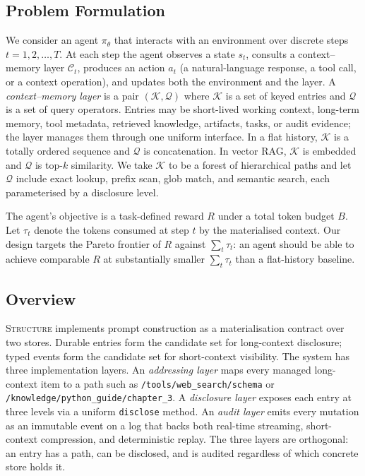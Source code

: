 
\subsection{Problem Formulation}
\label{sec:problem}

We consider an agent $\pi_\theta$ that interacts with an environment
over discrete steps $t = 1, 2, \dots, T$. At each step the agent
observes a state $s_t$, consults a context--memory layer
$\mathcal{C}_t$, produces an action $a_t$ (a natural-language response,
a tool call, or a context operation), and updates both the environment
and the layer. A \emph{context--memory layer} is a pair
$(\mathcal{K}, \mathcal{Q})$ where $\mathcal{K}$ is a set of keyed
entries and $\mathcal{Q}$ is a set of query operators. Entries may be
short-lived working context, long-term memory, tool metadata, retrieved
knowledge, artifacts, tasks, or audit evidence; the layer manages them
through one uniform interface. In a flat history, $\mathcal{K}$ is a
totally ordered sequence and $\mathcal{Q}$ is concatenation. In vector
RAG, $\mathcal{K}$ is embedded and $\mathcal{Q}$ is top-$k$ similarity.
We take $\mathcal{K}$ to be a forest of hierarchical paths and let
$\mathcal{Q}$ include exact lookup, prefix scan, glob match, and
semantic search, each parameterised by a disclosure level.

The agent's objective is a task-defined reward $R$ under a total
token budget $B$. Let $\tau_t$ denote the tokens consumed at step
$t$ by the materialised context. Our design targets the Pareto
frontier of $R$ against $\sum_t \tau_t$: an agent should be able to
achieve comparable $R$ at substantially smaller $\sum_t \tau_t$ than
a flat-history baseline.

\subsection{Overview}
\label{sec:overview}

\textsc{Structure} implements prompt construction as a materialisation
contract over two stores. Durable entries form the candidate set for
long-context disclosure; typed events form the candidate set for
short-context visibility. The system has three implementation layers. An
\emph{addressing layer} maps every managed long-context item to a path
such as \texttt{/tools/web\_search/schema} or
\texttt{/knowledge/python\_guide/chapter\_3}. A \emph{disclosure layer}
exposes each entry at three levels via a uniform \texttt{disclose}
method. An \emph{audit layer} emits every mutation as an immutable
event on a log that backs both real-time streaming, short-context
compression, and deterministic replay. The three layers are
orthogonal: an entry has a path, can be disclosed, and is audited
regardless of which concrete store holds it.

